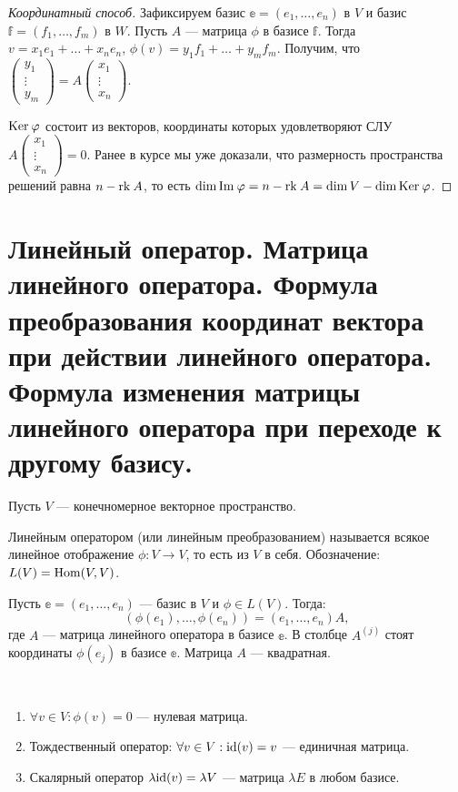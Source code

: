 \begin{proof}[Координатный способ]
    Зафиксируем базис $\mathbb{e} = (e_1, \ldots, e_n)$ в $V$ и базис $\mathbb{f} = (f_1, \ldots, f_m)$ в $W$. Пусть $A$ --- матрица $\phi$ в базисе $\mathbb{f}$. Тогда $v = x_1e_1 + \ldots + x_ne_n$, $\phi(v) = y_1f_1 + \ldots + y_mf_m$. Получим, что $\begin{pmatrix} y_1\\ \vdots \\ y_m \end{pmatrix} = A \begin{pmatrix} x_1\\ \vdots \\ x_n\end{pmatrix}$. 
    
    $\mathrm{Ker}\: \varphi$ состоит из векторов, координаты которых удовлетворяют СЛУ $ A \begin{pmatrix} x_1\\ \vdots \\ x_n\end{pmatrix} = 0$. Ранее в курсе мы уже доказали, что размерность пространства решений равна $n - \mathrm{rk}\: A$, то есть $\dim \mathrm{Im\:} \varphi = n - \mathrm{rk}\: A = \dim V - \dim \mathrm{Ker}\: \varphi$.
\end{proof}

\section{Линейный оператор. Матрица линейного оператора. Формула преобразования координат вектора при действии линейного оператора. Формула изменения матрицы линейного оператора при переходе к другому базису.}

Пусть $V$ --- конечномерное векторное пространство.

\begin{Def}
    Линейным оператором (или линейным преобразованием) называется всякое линейное отображение $\phi \colon V \rightarrow V$, то есть из $V$ в себя. Обозначение: $L(V) = \mathrm{Hom}(V, V)$.
\end{Def}

\par Пусть $\mathbb{e} = (e_1, \ldots, e_n)$ --- базис в $V$ и $\phi \in L(V)$. Тогда:
$$
\left(\phi(e_1), \ldots, \phi(e_n)\right) = \left(e_1, \ldots, e_n\right)A,
$$
где $A$ --- матрица линейного оператора в базисе $\mathbb{e}$. В столбце $A^{\left( j\right)}$ стоят координаты $\phi(e_j)$ в базисе $\mathbb{e}$. Матрица $A$ --- квадратная. 
\begin{Examples}\
    \begin{enumerate}
        \item $\forall v \in V : \phi(v) = 0$ --- нулевая матрица.
        \item Тождественный оператор: $\forall v \in V : \mathrm{id}(v) = v$ --- единичная матрица.
        \item Скалярный оператор $\lambda \mathrm{id}(v) = \lambda V$ --- матрица $\lambda E$ в любом базисе.
    \end{enumerate}
\end{Examples}

